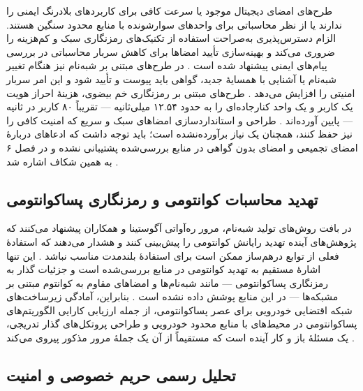 طرح‌های امضای دیجیتال موجود یا سرعت کافی برای کاربردهای بلادرنگ ایمنی را ندارند یا از نظر محاسباتی برای واحدهای سوارشونده با منابع محدود سنگین هستند. الزام دسترس‌پذیری به‌صراحت استفاده از تکنیک‌های رمزنگاری سبک و کم‌هزینه را ضروری می‌کند \cite{farsimadanReviewSecurityChallenges2025} و بهینه‌سازی تأیید امضاها برای کاهش سربار محاسباتی در بررسی پیام‌های ایمنی پیشنهاد شده است \cite{SecuringVehicularAd}. در طرح‌های مبتنی بر شبه‌نام نیز هنگام تغییر شبه‌نام یا آشنایی با همسایهٔ جدید، گواهی باید پیوست و تأیید شود و این امر سربار امنیتی را افزایش می‌دهد \cite{al-aniPrivacySafetyImprovement2023}. طرح‌های مبتنی بر رمزنگاری خم بیضوی، هزینهٔ احراز هویت یک کاربر و یک واحد کنارجاده‌ای را به حدود ۱۲.۵۴ میلی‌ثانیه — تقریباً ۸۰ کاربر در ثانیه — پایین آورده‌اند \cite{mariaBAIVEfficientBlockchainBased2022}. طراحی و استانداردسازی امضاهای سبک و سریع که امنیت کافی را نیز حفظ کنند، همچنان یک نیاز برآورده‌نشده است؛ باید توجه داشت که ادعاهای دربارهٔ امضای تجمیعی و امضای بدون گواهی در منابع بررسی‌شده پشتیبانی نشده و در فصل ۶ به همین شکاف اشاره شد \cite{farsimadanReviewSecurityChallenges2025, SecuringVehicularAd}.

\subsection{تهدید محاسبات کوانتومی و رمزنگاری پساکوانتومی}

در بافت روش‌های تولید شبه‌نام، مرور ره‌آواتی آگوستینا و همکاران پیشنهاد می‌کنند که پژوهش‌های آینده تهدید رایانش کوانتومی را پیش‌بینی کنند و هشدار می‌دهند که استفادهٔ فعلی از توابع درهم‌ساز ممکن است برای استفادهٔ بلندمدت مناسب نباشد \cite{rahmawatiagustinaSystematicLiteratureReview2025}. این تنها اشارهٔ مستقیم به تهدید کوانتومی در منابع بررسی‌شده است و جزئیات گذار به رمزنگاری پساکوانتومی  — مانند شبه‌نام‌ها و امضاهای مقاوم به کوانتوم مبتنی بر مشبکه‌ها  — در این منابع پوشش داده نشده است \cite{rahmawatiagustinaSystematicLiteratureReview2025}. بنابراین، آمادگی زیرساخت‌های شبکه اقتضایی خودرویی برای عصر پساکوانتومی، از جمله ارزیابی کارایی الگوریتم‌های پساکوانتومی در محیط‌های با منابع محدود خودرویی و طراحی پروتکل‌های گذار تدریجی، یک مسئلهٔ باز و کار آینده است که مستقیماً از آن یک جملهٔ مرور مذکور پیروی می‌کند \cite{rahmawatiagustinaSystematicLiteratureReview2025}.

\subsection{تحلیل رسمی حریم خصوصی و امنیت}

